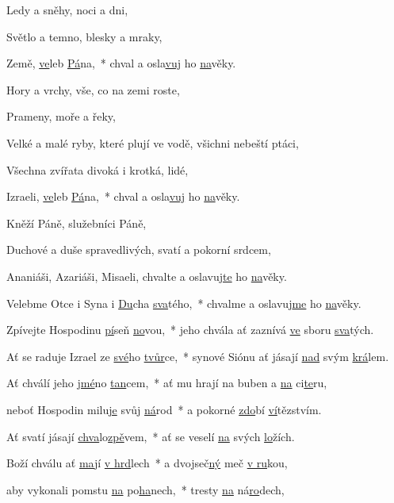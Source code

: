Ledy a sněhy, \velebteA
noci a dni, \velebteB

Světlo a temno, \velebteA
blesky a mraky, \velebteB

Země, \underline{ve}leb \underline{Pá}na,~*
chval a osla\underline{vuj} ho \underline{na}věky.

Hory a vrchy, \velebteA
vše, co na zemi roste, \velebteB

Prameny, \velebteA
moře a řeky, \velebteB

Velké a malé ryby, které plují ve vodě, \velebteA
všichni nebeští ptáci, \velebteB

Všechna zvířata divoká i krotká, \velebteA
lidé, \velebteB

Izraeli, \underline{ve}leb \underline{Pá}na,~*
chval a osla\underline{vuj} ho \underline{na}věky.

Kněží Páně, \velebteA
služebníci Páně, \velebteB

Duchové a duše spravedlivých, \velebteA
svatí a pokorní srdcem, \velebteB

Ananiáši, Azariáši, Misaeli, \velebteA
chvalte a oslavuj\underline{te} ho \underline{na}věky.

Velebme Otce i Syna i \underline{Du}cha \underline{sva}tého,~*
chvalme a oslavuj\underline{me} ho \underline{na}věky.



Zpívejte Hospodinu \underline{pí}seň \underline{no}vou,~*
jeho chvála ať zaznívá \underline{ve} sboru \underline{sva}tých.

Ať se raduje Izrael ze \underline{své}ho \underline{tvůr}ce,~*
synové Siónu ať jásají \underline{nad} svým \underline{krá}lem.

Ať chválí jeho \underline{jmé}no \underline{tan}cem,~*
ať mu hrají na buben a \underline{na} ci\underline{te}ru,

neboť Hospodin milu\underline{je} svůj \underline{ná}rod~*
a pokorné \underline{zdo}bí \underline{ví}tězstvím.

Ať svatí jásají \underline{chva}lo\underline{zpě}vem,~*
ať se veselí \underline{na} svých \underline{lo}žích.

Boží chválu ať \underline{ma}jí \underline{v hrd}lech~*
a dvojseč\underline{ný} meč \underline{v ru}kou,

aby vykonali pomstu \underline{na} po\underline{ha}nech,~*
tresty \underline{na} ná\underline{ro}dech,

